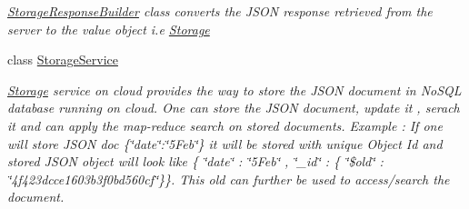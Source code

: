 \begin{DoxyCompactItemize}
\begin{DoxyCompactList}\small\item\em \hyperlink{classcom_1_1shephertz_1_1app42_1_1paas_1_1sdk_1_1windows_1_1storage_1_1_storage_response_builder}{Storage\+Response\+Builder} class converts the J\+S\+O\+N response retrieved from the server to the value object i.\+e \hyperlink{classcom_1_1shephertz_1_1app42_1_1paas_1_1sdk_1_1windows_1_1storage_1_1_storage}{Storage} \end{DoxyCompactList}\item 
class \hyperlink{classcom_1_1shephertz_1_1app42_1_1paas_1_1sdk_1_1windows_1_1storage_1_1_storage_service}{Storage\+Service}
\begin{DoxyCompactList}\small\item\em \hyperlink{classcom_1_1shephertz_1_1app42_1_1paas_1_1sdk_1_1windows_1_1storage_1_1_storage}{Storage} service on cloud provides the way to store the J\+S\+O\+N document in No\+S\+Q\+L database running on cloud. One can store the J\+S\+O\+N document, update it , serach it and can apply the map-\/reduce search on stored documents. Example \+: If one will store J\+S\+O\+N doc \{\char`\"{}date\char`\"{}\+:\char`\"{}5\+Feb\char`\"{}\} it will be stored with unique Object Id and stored J\+S\+O\+N object will look like \{ \char`\"{}date\char`\"{} \+: \char`\"{}5\+Feb\char`\"{} , \char`\"{}\+\_\+id\char`\"{} \+: \{ \char`\"{}\$old\char`\"{} \+: \char`\"{}4f423dcce1603b3f0bd560cf\char`\"{}\}\}. This old can further be used to access/search the document. \end{DoxyCompactList}\end{DoxyCompactItemize}
